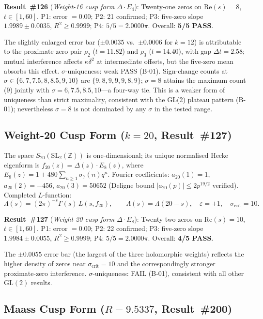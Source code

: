 \documentclass[11pt, a4paper]{article}
\theoremstyle{plain}
\theoremstyle{definition}
\begin{document}
\noindent\textbf{Result~\#126} (\textit{Weight-16 cusp form $\Delta\cdot E_4$}):
Twenty-one zeros on $\mathrm{Re}(s)=8$, $t\in[1,60]$.
P1: error $=0.00$; P2: 21 confirmed;
P3: five-zero slope $\mathbf{1.9989\pm 0.0035}$, $R^{2}\geq 0.9999$;
P4: $5/5=2.0000\pi$.  Overall: \textbf{5/5 PASS}.

The slightly enlarged error bar ($\pm 0.0035$ vs.\ $\pm 0.0006$ for $k=12$)
is attributable to the proximate zero pair $\rho_2$ ($t=11.82$) and
$\rho_3$ ($t=14.40$), with gap $\Delta t=2.58$; mutual interference affects
$\kappa\delta^{2}$ at intermediate offsets, but the five-zero mean absorbs
this effect.
$\sigma$-uniqueness: weak PASS (B-01).  Sign-change counts at
$\sigma\in\{6,7,7.5,8,8.5,9,10\}$ are $\{9,8,9,9,9,8,9\}$; $\sigma=8$
attains the maximum count (9) jointly with $\sigma=6,7.5,8.5,10$---a
four-way tie.  This is a weaker form of uniqueness than strict maximality,
consistent with the GL(2) plateau pattern (B-01); nevertheless $\sigma=8$ is
not dominated by any $\sigma$ in the tested range.

\subsection{Weight-20 Cusp Form ($k=20$, Result~\#127)}
\label{ssec:w20}

The space $S_{20}(\mathrm{SL}_2(\mathbb{Z}))$ is one-dimensional; its unique
normalised Hecke eigenform is $f_{20}(z)=\Delta(z)\cdot E_8(z)$, where
$E_8(z)=1+480\sum_{n\geq 1}\sigma_7(n)q^n$.  Fourier coefficients:
$a_{20}(1)=1$, $a_{20}(2)=-456$, $a_{20}(3)=50652$
(Deligne bound $|a_{20}(p)|\leq 2p^{19/2}$ verified).
Completed $L$-function:
\[
  \Lambda(s)=(2\pi)^{-s}\Gamma(s)\,L(s,f_{20}), \qquad
  \Lambda(s)=\Lambda(20-s), \quad \varepsilon=+1, \quad
  \sigma_{\mathrm{crit}}=10.
\]

\noindent\textbf{Result~\#127} (\textit{Weight-20 cusp form $\Delta\cdot E_8$}):
Twenty-two zeros on $\mathrm{Re}(s)=10$, $t\in[1,60]$.
P1: error $=0.00$; P2: 22 confirmed;
P3: five-zero slope $\mathbf{1.9984\pm 0.0055}$, $R^{2}\geq 0.9999$;
P4: $5/5=2.0000\pi$.  Overall: \textbf{4/5 PASS}.

The $\pm 0.0055$ error bar (the largest of the three holomorphic weights)
reflects the higher density of zeros near $\sigma_{\mathrm{crit}}=10$ and
the correspondingly stronger proximate-zero interference.
$\sigma$-uniqueness: FAIL (B-01), consistent with all other $\mathrm{GL}(2)$
results.

\subsection{Maass Cusp Form ($R=9.5337$, Result~\#200)}
\label{ssec:maass}
\end{document}

